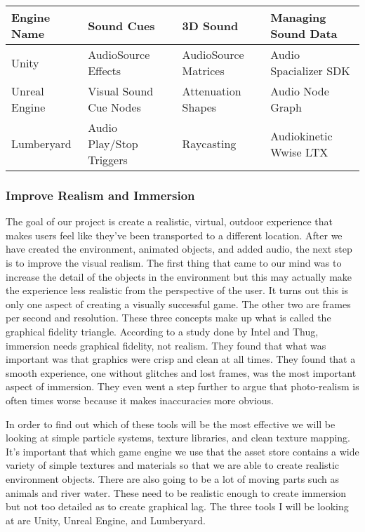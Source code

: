 \documentclass[10pt,journal,compsoc,onecolumn, draftclsnofoot]{IEEEtran}
\begin{document}
\vspace{2mm}
\begin{table}[h!]
\centering
  \begin{tabu} to 1.0\textwidth { | X[l] || X[c] | X[c] | X[c] }
  \hline
  Engine Name & Sound Cues & 3D Sound & Managing Sound Data\\
  \hline
  Unity  & AudioSource Effects & AudioSource Matrices & Audio Spacializer SDK\\
  Unreal Engine & Visual Sound Cue Nodes & Attenuation Shapes & Audio Node Graph\\
  Lumberyard & Audio Play/Stop Triggers & Raycasting & Audiokinetic Wwise LTX\\
  \hline
  \end{tabu}
\end{table}
\vspace{2mm}


\subsubsection{Improve Realism and Immersion}
The goal of our project is create a realistic, virtual, outdoor experience that makes users feel like they’ve been transported to a different location.
After we have created the environment, animated objects, and added audio, the next step is to improve the visual realism.
The first thing that came to our mind was to increase the detail of the objects in the environment but this may actually make the experience less realistic from the perspective of the user.
It turns out this is only one aspect of creating a visually successful game.
The other two are frames per second and resolution.
These three concepts make up what is called the graphical fidelity triangle.
According to a study done by Intel and Thug\cite{michalak_lind_round1}, immersion needs graphical fidelity, not realism.
They found that what was important was that graphics were crisp and clean at all times.
They found that a smooth experience, one without glitches and lost frames, was the most important aspect of immersion.
They even went a step further to argue that photo-realism is often times worse because it makes inaccuracies more obvious.

In order to find out which of these tools will be the most effective we will be looking at simple particle systems, texture libraries, and clean texture mapping.
It’s important that which game engine we use that the asset store contains a wide variety of simple textures and materials so that we are able to create realistic environment objects.
There are also going to be a lot of moving parts such as animals and river water.
These need to be realistic enough to create immersion but not too detailed as to create graphical lag.
The three tools I will be looking at are Unity, Unreal Engine, and Lumberyard.
\end{document}
